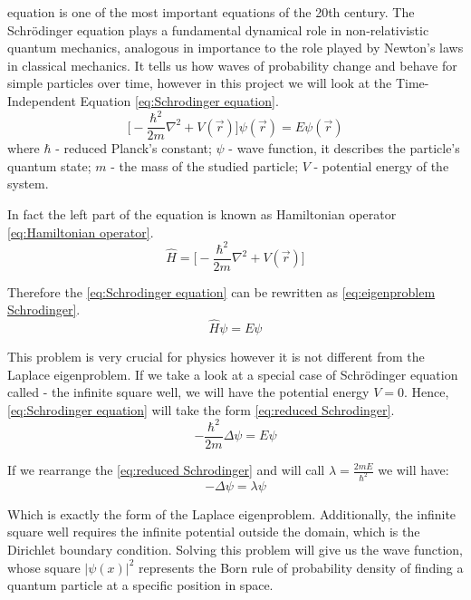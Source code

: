 \documentclass[conference]{IEEEtran}
\begin{document}
 equation is one of the most important equations of the 20th century. The Schr\"{o}dinger equation plays a fundamental dynamical role in non-relativistic quantum mechanics, analogous in importance to the role played by Newton's laws in classical mechanics. It tells us how waves of probability change and behave for simple particles over time, however in this project we will look at the Time-Independent  Equation \ref{eq:Schrodinger equation}.
\begin{equation}
    \Bigg[-\frac{\hbar^2}{2m}\nabla^2 + V(\vec{r})\Bigg]\psi({\vec{r}}) = E\psi(\vec{r})
    \label{eq:Schrodinger equation}
\end{equation}
where $\hbar$ - reduced Planck's constant; $\psi$ - wave function, it describes the particle's quantum state; $m$ - the mass of the studied particle; $V$ - potential energy of the system.

In fact the left part of the equation is known as Hamiltonian operator \ref{eq:Hamiltonian operator}.
\begin{equation}
    \hat{H} = \Bigg[-\frac{\hbar^2}{2m}\nabla^2 + V(\vec{r})\Bigg]
    \label{eq:Hamiltonian operator}
\end{equation}

Therefore the \ref{eq:Schrodinger equation} can be rewritten as \ref{eq:eigenproblem Schrodinger}.
\begin{equation}
    \hat{H}\psi = E\psi
    \label{eq:eigenproblem Schrodinger}
\end{equation}

This problem is very crucial for physics however it is not different from the Laplace eigenproblem. If we take a look at a special case of Schr\"{o}dinger equation called - the infinite square well, we will have the potential energy $V = 0$. 
Hence, \ref{eq:Schrodinger equation} will take the form \ref{eq:reduced Schrodinger}.
\begin{equation}
    -\frac{\hbar^2}{2m}\Delta\psi = E\psi
    \label{eq:reduced Schrodinger}
\end{equation}

If we rearrange the \ref{eq:reduced Schrodinger} and will call $\lambda = \frac{2mE}{\hbar^2}$ we will have:
\begin{equation}
    -\Delta\psi = \lambda\psi
\end{equation}

Which is exactly the form of the Laplace eigenproblem. Additionally, the infinite square well requires the infinite potential outside the domain, which is the Dirichlet boundary condition.
Solving this problem will give us the wave function, whose square $|\psi(x)|^2$ represents the Born rule of probability density of finding a quantum particle at a specific position in space.
\end{document}
